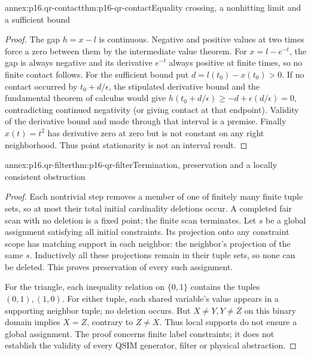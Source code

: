 \begin{annexitem}{annex:p16.qr-contact}{thm:p16-qr-contact}{Equality crossing, a nonhitting limit and a sufficient bound}
\begin{proof}
The gap \(h=x-l\) is continuous. Negative and positive values at two
times force a zero between them by the intermediate value theorem.
For \(x=l-e^{-t}\), the gap is always negative and its derivative
\(e^{-t}\) always positive at finite times, so no finite contact follows.
For the sufficient bound put \(d=l(t_0)-x(t_0)>0\). If no contact
occurred by \(t_0+d/\epsilon\), the stipulated derivative bound and
the fundamental theorem of calculus would give
\(h(t_0+d/\epsilon)\ge -d+\epsilon(d/\epsilon)=0\), contradicting
continued negativity (or giving contact at that endpoint). Validity of
the derivative bound and mode through that interval is a premise.
Finally \(x(t)=t^2\) has derivative zero at zero but is not constant
on any right neighborhood. Thus point stationarity is not an interval result.
\end{proof}
\end{annexitem}

\begin{annexitem}{annex:p16.qr-filter}{thm:p16-qr-filter}{Termination, preservation and a locally consistent obstruction}
\begin{proof}
Each nontrivial step removes a member of one of finitely many finite tuple
sets, so at most their total initial cardinality deletions occur. A completed
fair scan with no deletion is a fixed point; the finite scan terminates.
Let \(s\) be a global assignment satisfying all initial constraints.
Its projection onto any constraint scope has matching support in each
neighbor: the neighbor's projection of the same \(s\). Inductively all
these projections remain in their tuple sets, so none can be deleted.
This proves preservation of every such assignment.

For the triangle, each inequality relation on \(\{0,1\}\) contains
the tuples \((0,1),(1,0)\). For either tuple, each shared variable's
value appears in a supporting neighbor tuple; no deletion occurs. But
\(X\ne Y,Y\ne Z\) on this binary domain implies \(X=Z\), contrary
to \(Z\ne X\). Thus local supports do not ensure a global assignment.
The proof concerns finite label constraints; it does not establish the
validity of every QSIM generator, filter or physical abstraction.
\end{proof}
\end{annexitem}

